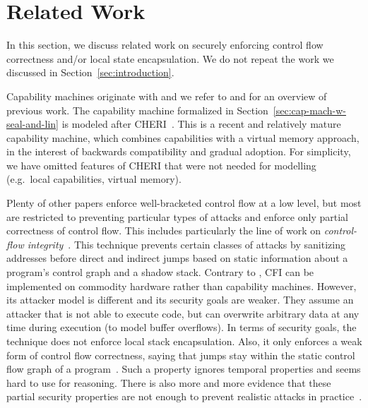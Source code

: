 \documentclass[acmsmall,review,anonymous]{acmart}\settopmatter{printfolios=true,printccs=false,printacmref=false}
\begin{document}
\section{Related Work}

In this section, we discuss related work on securely enforcing control flow correctness and/or local state encapsulation.
We do not repeat the work we discussed in Section~\ref{sec:introduction}.

Capability machines originate with \citet{dennis_programming_1966} and we refer to \citet{levy_capability-based_1984} and \citet{watson_cheri:_2015} for an overview of previous work.
The capability machine formalized in Section~\ref{sec:cap-mach-w-seal-and-lin} is modeled after CHERI~\citep{watson_cheri:_2015,woodruff_cheri_2014}.
This is a recent and relatively mature capability machine, which combines capabilities with a virtual memory approach, in the interest of backwards compatibility and gradual adoption.
For simplicity, we have omitted features of CHERI that were not needed for modelling \stktokens{} (e.g.\ local capabilities, virtual memory).

Plenty of other papers enforce well-bracketed control flow at a low level, but most are restricted to preventing particular types of attacks and enforce only partial correctness of control flow.
This includes particularly the line of work on \emph{control-flow integrity}~\citep{abadi_control-flow_2005}.
This technique prevents certain classes of attacks by sanitizing addresses before direct and indirect jumps based on static information about a program's control graph and a shadow stack.
Contrary to \stktokens{}, CFI can be implemented on commodity hardware rather than capability machines.
However, its attacker model is different and its security goals are weaker.
They assume an attacker that is not able to execute code, but can overwrite arbitrary data at any time during execution (to model buffer overflows).
In terms of security goals, the technique does not enforce local stack encapsulation.
Also, it only enforces a weak form of control flow correctness, saying that jumps stay within the static control flow graph of a program~\cite{Abadi2005Theory}.
Such a property ignores temporal properties and seems hard to use for reasoning.
There is also more and more evidence that these partial security properties are not enough to prevent realistic attacks in practice~\citep{Evans:2015:CJW:2810103.2813646,Carlini2015ControlFlowBending}.
\end{document}

